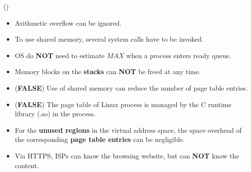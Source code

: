 \begin{theorem}{()}
\begin{itemize}
        \item Arithmetic overflow can be ignored.
        \item To use shared memory, several system calls have to be invoked.
        \item OS do \textbf{NOT} need to estimate $MAX$ when a process enters ready queue.
        \item Memory blocks on the \textbf{stacks} can \textbf{NOT} be freed at any time.
        \item (\textbf{FALSE}) Use of shared memory can reduce the number of page table entries.
        \item (\textbf{FALSE}) The page table of Linux process is managed by the C runtime library (.so) in the process.
        \item For the \textbf{unused regions} in the virtual address space, the space overhead of the corresponding \textbf{page table entries} can be negligible.
        \item Via HTTPS, ISPs can know the browsing website, but can \textbf{NOT} know the content.
    \end{itemize}
\end{theorem}

